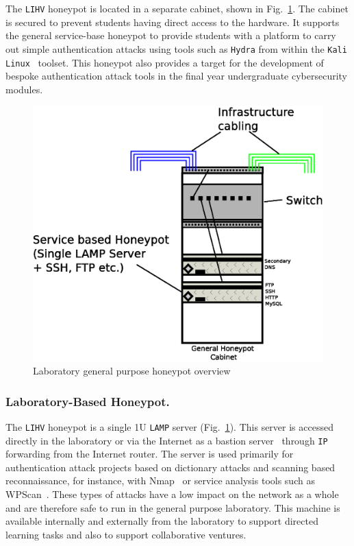 \documentclass{llncs}
\begin{document}
The \texttt{LIHV} honeypot is located in a separate cabinet, shown in
Fig.~\ref{fig:Overview2}. The cabinet is secured to prevent students having
direct access to the hardware. It supports the general service-base honeypot to
provide students with a platform to carry out simple authentication attacks
using tools such as \texttt{Hydra} from within the \texttt{Kali
Linux}~\cite{OS:17} toolset. This honeypot also provides a target for the
development of bespoke authentication attack tools in the final year
undergraduate cybersecurity modules.

\begin{figure}[h]
\begin{center}
	\includegraphics[scale=0.4]{Images/Infrastructure2.eps}
\caption{Laboratory general purpose honeypot overview}
\label{fig:Overview2}
\end{center}
\end{figure}

\subsubsection{Laboratory-Based Honeypot.}

The \texttt{LIHV} honeypot is a single 1U \texttt{LAMP} server
(Fig.~\ref{fig:Overview2}). This server is accessed directly in the
laboratory or via the Internet as a bastion server~\cite{MB:05} through
\texttt{IP} forwarding from the Internet router. The server is used primarily
for authentication attack projects based on dictionary attacks and scanning
based reconnaissance, for instance, with Nmap~\cite{GFL:09} or service analysis
tools such as WPScan~\cite{WT:17}. These types of attacks have a low impact on
the network as a whole and are therefore safe to run in the general purpose
laboratory. This machine is available internally and externally from the
laboratory to support directed learning tasks and also to support collaborative
ventures.
\end{document}

